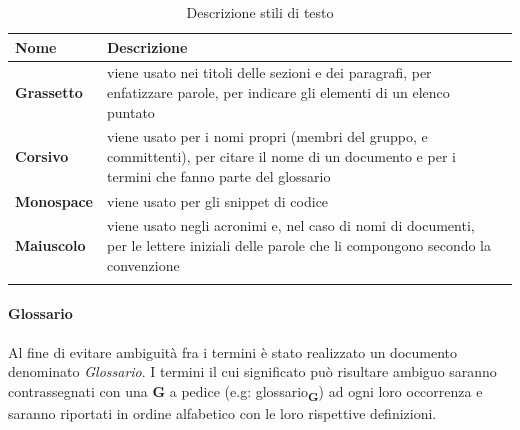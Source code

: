 {	\setlength{\freewidth}{\dimexpr\textwidth-1\tabcolsep}
	\renewcommand{\arraystretch}{1.5}
	\setlength{\aboverulesep}{0pt}
	\setlength{\belowrulesep}{0pt}
	\begin{longtable}{L{.210\freewidth} L{.6\freewidth} L{.080\freewidth}}
		\textbf{Nome} & \textbf{Descrizione} \\
		\toprule
		\endhead		
		\textbf{Grassetto} & viene usato nei titoli delle sezioni e dei paragrafi, per enfatizzare parole, per indicare gli elementi di un elenco puntato \\
		\textbf{Corsivo} & viene usato per i nomi propri (membri del gruppo,   e committenti), per citare il nome di un documento e per i termini che fanno parte del glossario\\
		\textbf{Monospace} & viene usato per gli snippet di codice \\
		\textbf{Maiuscolo} & viene usato negli acronimi e, nel caso di nomi di documenti, per le lettere iniziali delle parole che li compongono secondo la convenzione \textit{} \\
		\bottomrule
		\hiderowcolors
		\caption{Descrizione stili di testo}
	\end{longtable}
\paragraph*{Glossario}  
Al fine di evitare ambiguità fra i termini è stato realizzato un documento denominato \textit{Glossario}. I termini il cui significato può risultare ambiguo saranno contrassegnati con una \textbf{G} a pedice (e.g: \texorpdfstring{glossario\textsubscript{\textbf{G}}})) ad ogni loro occorrenza e saranno riportati in ordine alfabetico con le loro rispettive definizioni. 
}
